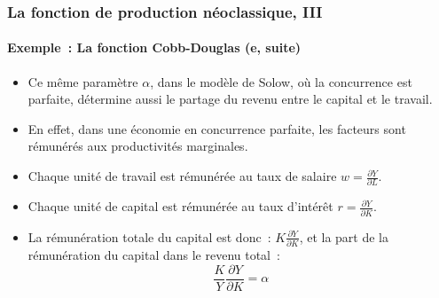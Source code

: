 \documentclass[10pt,notheorems]{beamer}
\theoremstyle{plain}
\theoremstyle{definition} %
\begin{document}
\begin{frame}
  \frametitle{La fonction de production néoclassique, III}
  \framesubtitle{Exemple~: La fonction Cobb-Douglas (e, suite)}

  \medskip

  \begin{itemize}

  \item Ce même paramètre $\alpha$, dans le modèle de Solow, où la concurrence est parfaite, détermine aussi le partage du revenu entre le capital et le travail.\newline

  \item En effet, dans une économie en concurrence parfaite, les facteurs sont rémunérés aux productivités marginales.\newline

  \item Chaque unité de travail est rémunérée au taux de salaire $w=\frac{\partial Y}{\partial L}$.\newline

  \item Chaque unité de capital est rémunérée au taux d'intérêt $r = \frac{\partial Y}{\partial K}$.\newline

  \item La rémunération totale du capital est donc~: $K\frac{\partial Y}{\partial K}$, et la part de la rémunération du capital dans le revenu total~:
    \[
      \frac{K}{Y}\frac{\partial Y}{\partial K} = \alpha
    \]

  \end{itemize}
\end{frame}
\end{document}
